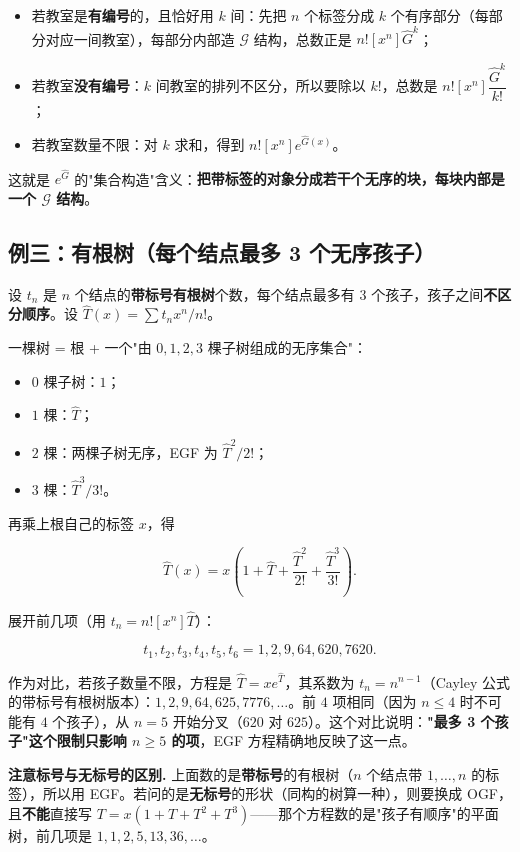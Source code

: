 \begin{itemize}
\item 若教室是\textbf{有编号}的，且恰好用 $k$ 间：先把 $n$ 个标签分成 $k$ 个有序部分（每部分对应一间教室），每部分内部造 $\mathcal G$ 结构，总数正是 $n![x^n]\hat G^k$；
\item 若教室\textbf{没有编号}：$k$ 间教室的排列不区分，所以要除以 $k!$，总数是 $n![x^n]\dfrac{\hat G^k}{k!}$；
\item 若教室数量不限：对 $k$ 求和，得到 $n![x^n]e^{\hat G(x)}$。
\end{itemize}


这就是 $e^{\hat G}$ 的"集合构造"含义：\textbf{把带标签的对象分成若干个无序的块，每块内部是一个 $\mathcal G$ 结构}。

\subsection{例三：有根树（每个结点最多 3 个无序孩子）}


设 $t_n$ 是 $n$ 个结点的\textbf{带标号有根树}个数，每个结点最多有 $3$ 个孩子，孩子之间\textbf{不区分顺序}。设 $\hat T(x)=\sum t_nx^n/n!$。

一棵树 = 根 + 一个"由 $0,1,2,3$ 棵子树组成的无序集合"：
\begin{itemize}
\item $0$ 棵子树：$1$；
\item $1$ 棵：$\hat T$；
\item $2$ 棵：两棵子树无序，EGF 为 $\hat T^2/2!$；
\item $3$ 棵：$\hat T^3/3!$。
\end{itemize}


再乘上根自己的标签 $x$，得

\[
\hat T(x)=x\left(1+\hat T+\frac{\hat T^2}{2!}+\frac{\hat T^3}{3!}\right).
\]

展开前几项（用 $t_n=n![x^n]\hat T$）：

\[
t_1,t_2,t_3,t_4,t_5,t_6=1,2,9,64,620,7620.
\]

作为对比，若孩子数量不限，方程是 $\hat T=xe^{\hat T}$，其系数为 $t_n=n^{n-1}$（Cayley 公式的带标号有根树版本）：$1,2,9,64,625,7776,\dots$。前 $4$ 项相同（因为 $n\le4$ 时不可能有 $4$ 个孩子），从 $n=5$ 开始分叉（$620$ 对 $625$）。这个对比说明：\textbf{"最多 3 个孩子"这个限制只影响 $n\ge5$ 的项}，EGF 方程精确地反映了这一点。

\textbf{注意标号与无标号的区别.} 上面数的是\textbf{带标号}的有根树（$n$ 个结点带 $1,\dots,n$ 的标签），所以用 EGF。若问的是\textbf{无标号}的形状（同构的树算一种），则要换成 OGF，且\textbf{不能}直接写 $T=x(1+T+T^2+T^3)$——那个方程数的是"孩子有顺序"的平面树，前几项是 $1,1,2,5,13,36,\dots$。

